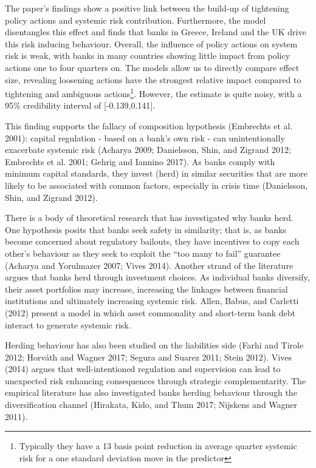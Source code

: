 \documentclass[
  10pt,
]{article}
\begin{document}
The paper's findings show a positive link between the build-up of
tightening policy actions and systemic risk contribution. Furthermore,
the model disentangles this effect and finds that banks in Greece,
Ireland and the UK drive this risk inducing behaviour. Overall, the
influence of policy actions on system risk is weak, with banks in many
countries showing little impact from policy actions one to four quarters
on. The models allow us to directly compare effect size, revealing
loosening actions have the strongest relative impact compared to
tightening and ambiguous actions\footnote{Typically they have a 13 basis
  point reduction in average quarter systemic risk for a one standard
  deviation move in the predictor}. However, the estimate is quite
noisy, with a 95\% credibility interval of {[}-0.139,0.141{]}.

This finding supports the fallacy of composition hypothesis (Embrechts
et al. 2001): capital regulation - based on a bank's own risk - can
unintentionally exacerbate systemic risk (Acharya 2009; Danielsson,
Shin, and Zigrand 2012; Embrechts et al. 2001; Gehrig and Iannino 2017).
As banks comply with minimum capital standards, they invest (herd) in
similar securities that are more likely to be associated with common
factors, especially in crisis time (Danielsson, Shin, and Zigrand 2012).

There is a body of theoretical research that has investigated why banks
herd. One hypothesis posits that banks seek safety in similarity; that
is, as banks become concerned about regulatory bailouts, they have
incentives to copy each other's behaviour as they seek to exploit the
``too many to fail'' guarantee (Acharya and Yorulmazer 2007; Vives
2014). Another strand of the literature argues that banks herd through
investment choices. As individual banks diversify, their asset
portfolios may increase, increasing the linkages between financial
institutions and ultimately increasing systemic risk. Allen, Babus, and
Carletti (2012) present a model in which asset commonality and
short-term bank debt interact to generate systemic risk.

Herding behaviour has also been studied on the liabilities side (Farhi
and Tirole 2012; Horváth and Wagner 2017; Segura and Suarez 2011; Stein
2012). Vives (2014) argues that well-intentioned regulation and
supervision can lead to unexpected risk enhancing consequences through
strategic complementarity. The empirical literature has also
investigated banks herding behaviour through the diversification channel
(Hirakata, Kido, and Thum 2017; Nijskens and Wagner 2011).
\end{document}
